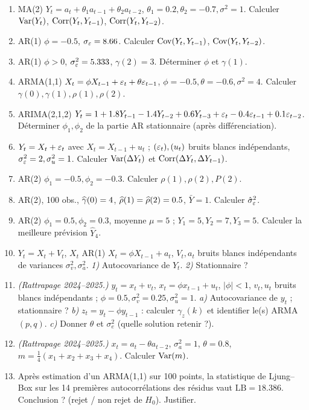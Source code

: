 \documentclass[11pt]{article}
\begin{document}
\begin{enumerate}[label=\textbf{Q\,J.\arabic*},leftmargin=*]
\item MA(2) $Y_t=a_t+\theta_1a_{t-1}+\theta_2a_{t-2}$, $\theta_1=0.2,\theta_2=-0.7,\sigma^2=1$.
Calculer $\operatorname{Var}(Y_t)$, $\operatorname{Corr}(Y_t,Y_{t-1})$, $\operatorname{Corr}(Y_t,Y_{t-2})$.

\item AR(1) $\phi=-0.5$, $\sigma_\varepsilon=8.66$. Calculer $\operatorname{Cov}(Y_t,Y_{t-1})$, $\operatorname{Cov}(Y_t,Y_{t-2})$.

\item AR(1) $\phi>0$, $\sigma_\varepsilon^2=5.333$, $\gamma(2)=3$. Déterminer $\phi$ et $\gamma(1)$.

\item ARMA(1,1) $X_t=\phi X_{t-1}+\varepsilon_t+\theta\varepsilon_{t-1}$, $\phi=-0.5,\theta=-0.6,\sigma^2=4$.
Calculer $\gamma(0),\gamma(1),\rho(1),\rho(2)$.

\item ARIMA(2,1,2)
$Y_t=1+1.8Y_{t-1}-1.4Y_{t-2}+0.6Y_{t-3}+\varepsilon_t-0.4\varepsilon_{t-1}+0.1\varepsilon_{t-2}$.
Déterminer $\phi_1,\phi_2$ de la partie AR stationnaire (après différenciation).

\item $Y_t=X_t+\varepsilon_t$ avec $X_t=X_{t-1}+u_t$ ; $(\varepsilon_t),(u_t)$ bruits blancs indépendants,
$\sigma_\varepsilon^2=2,\sigma_u^2=1$. Calculer $\operatorname{Var}(\Delta Y_t)$ et $\operatorname{Corr}(\Delta Y_t,\Delta Y_{t-1})$.

\item AR(2) $\phi_1=-0.5,\phi_2=-0.3$. Calculer $\rho(1),\rho(2),P(2)$.

\item AR(2), 100 obs., $\widehat{\gamma}(0)=4$, $\widehat{\rho}(1)=\widehat{\rho}(2)=0.5$, $\bar Y=1$. Calculer
$\hat\sigma_\varepsilon^2$.

\item AR(2) $\phi_1=0.5,\phi_2=0.3$, moyenne $\mu=5$ ; $Y_1=5,Y_2=7,Y_3=5$. Calculer la
meilleure prévision $\widehat Y_4$.

\item $Y_t=X_t+V_t$, $X_t$ AR(1) $X_t=\phi X_{t-1}+a_t$, $V_t,a_t$ bruits blancs indépendants
de variances $\sigma_v^2,\sigma_a^2$. \emph{1)} Autocovariance de $Y_t$. \emph{2)}
Stationnaire ?

\item \emph{(Rattrapage 2024--2025.)} $y_t=x_t+v_t$, $x_t=\phi x_{t-1}+u_t$, $|\phi|<1$,
$v_t,u_t$ bruits blancs indépendants ; $\phi=0.5,\sigma_v^2=0.25,\sigma_u^2=1$.
\emph{a)} Autocovariance de $y_t$ ; stationnaire ? \emph{b)} $z_t=y_t-\phi y_{t-1}$ :
calculer $\gamma_z(k)$ et identifier le(s) ARMA$(p,q)$. \emph{c)} Donner $\theta$ et
$\sigma_e^2$ (quelle solution retenir ?).

\item \emph{(Rattrapage 2024--2025.)} $x_t=a_t-\theta a_{t-2}$, $\sigma_a^2=1$, $\theta=0.8$,
$m=\tfrac14(x_1+x_2+x_3+x_4)$. Calculer $\operatorname{Var}(m)$.

\item Après estimation d'un ARMA(1,1) sur 100 points, la statistique de Ljung--Box sur les 14
premières autocorrélations des résidus vaut $\mathrm{LB}=18.386$. Conclusion ? (rejet / non
rejet de $H_0$). Justifier.
\end{enumerate}
\end{document}
